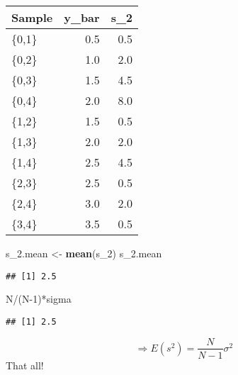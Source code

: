 \documentclass[
]{article}
\newenvironment{Shaded}{\begin{snugshade}}{\end{snugshade}}
\newcommand{\DecValTok}[1]{\textcolor[rgb]{0.27,0.67,0.26}{#1}}
\newcommand{\FunctionTok}[1]{\textcolor[rgb]{1.00,0.58,0.35}{\textbf{#1}}}
\newcommand{\NormalTok}[1]{\textcolor[rgb]{0.74,0.68,0.62}{#1}}
\newcommand{\OtherTok}[1]{\textcolor[rgb]{0.74,0.68,0.62}{#1}}
\newcommand{\SpecialCharTok}[1]{\textcolor[rgb]{0.02,0.61,0.04}{#1}}
\begin{document}
\begin{longtable}[]{@{}lrr@{}}
\toprule()
Sample & y\_bar & s\_2 \\
\midrule()
\endhead
\{0,1\} & 0.5 & 0.5 \\
\{0,2\} & 1.0 & 2.0 \\
\{0,3\} & 1.5 & 4.5 \\
\{0,4\} & 2.0 & 8.0 \\
\{1,2\} & 1.5 & 0.5 \\
\{1,3\} & 2.0 & 2.0 \\
\{1,4\} & 2.5 & 4.5 \\
\{2,3\} & 2.5 & 0.5 \\
\{2,4\} & 3.0 & 2.0 \\
\{3,4\} & 3.5 & 0.5 \\
\bottomrule()
\end{longtable}

\begin{Shaded}
\begin{Highlighting}[]
\NormalTok{s\_2.mean }\OtherTok{\textless{}{-}} \FunctionTok{mean}\NormalTok{(s\_2)}
\NormalTok{s\_2.mean}
\end{Highlighting}
\end{Shaded}

\begin{verbatim}
## [1] 2.5
\end{verbatim}

\begin{Shaded}
\begin{Highlighting}[]
\NormalTok{N}\SpecialCharTok{/}\NormalTok{(N}\DecValTok{{-}1}\NormalTok{)}\SpecialCharTok{*}\NormalTok{sigma}
\end{Highlighting}
\end{Shaded}

\begin{verbatim}
## [1] 2.5
\end{verbatim}

\[\Rightarrow E(s^2) = \frac{N}{N-1}\sigma^2\] That all!
\end{document}
